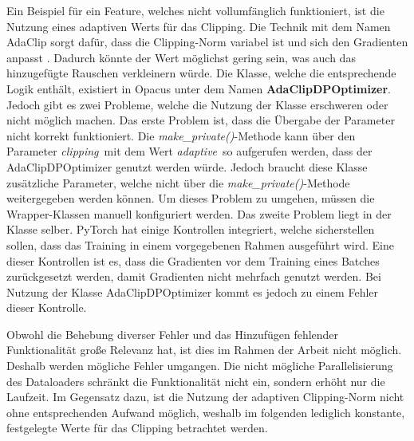 Ein Beispiel für ein Feature, welches nicht vollumfänglich funktioniert, ist die Nutzung eines adaptiven Werts für das Clipping.
Die Technik mit dem Namen AdaClip sorgt dafür, dass die Clipping-Norm variabel ist und sich den Gradienten anpasst \cite{adaclip}.
Dadurch könnte der Wert möglichst gering sein, was auch das hinzugefügte Rauschen verkleinern würde.
Die Klasse, welche die entsprechende Logik enthält, existiert in Opacus unter dem Namen \textbf{AdaClipDPOptimizer}.
Jedoch gibt es zwei Probleme, welche die Nutzung der Klasse erschweren oder nicht möglich machen.
Das erste Problem ist, dass die Übergabe der Parameter nicht korrekt funktioniert. 
Die \textit{make\_private()}-Methode kann über den Parameter \dq\textit{clipping}\dq\ mit dem Wert \dq\textit{adaptive}\dq\ so aufgerufen werden, dass der AdaClipDPOptimizer genutzt werden würde.
Jedoch braucht diese Klasse zusätzliche Parameter, welche nicht über die \textit{make\_private()}-Methode weitergegeben werden können.
Um dieses Problem zu umgehen, müssen die Wrapper-Klassen manuell konfiguriert werden.
Das zweite Problem liegt in der Klasse selber.
PyTorch hat einige Kontrollen integriert, welche sicherstellen sollen, dass das Training in einem vorgegebenen Rahmen ausgeführt wird. 
Eine dieser Kontrollen ist es, dass die Gradienten vor dem Training eines Batches zurückgesetzt werden, damit Gradienten nicht mehrfach genutzt werden.
Bei Nutzung der Klasse AdaClipDPOptimizer kommt es jedoch zu einem Fehler dieser Kontrolle.

Obwohl die Behebung diverser Fehler und das Hinzufügen fehlender Funktionalität große Relevanz hat, ist dies im Rahmen der Arbeit nicht möglich.
Deshalb werden mögliche Fehler umgangen.
Die nicht mögliche Parallelisierung des Dataloaders schränkt die Funktionalität nicht ein, sondern erhöht nur die Laufzeit. 
Im Gegensatz dazu, ist die Nutzung der adaptiven Clipping-Norm nicht ohne entsprechenden Aufwand möglich, weshalb im folgenden lediglich konstante, festgelegte Werte für das Clipping betrachtet werden.

